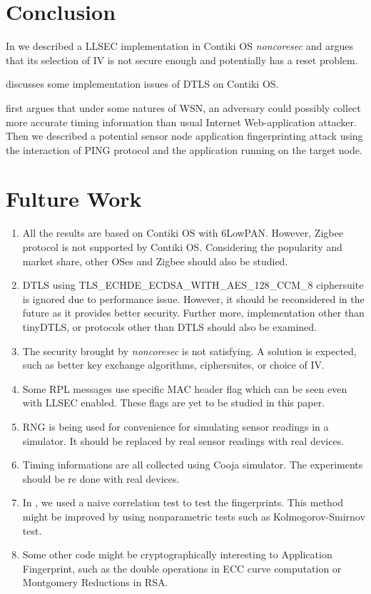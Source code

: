 \chapter{Conclusion} \label{Chp: Conclusion}

In  we described a LLSEC implementation in Contiki OS \textit{noncoresec} and argues that its selection of IV is not secure enough and potentially has a reset problem.

 discusses some implementation issues of DTLS on Contiki OS.

 first argues that under some natures of WSN, an adversary could possibly collect more accurate timing information than usual Internet Web-application attacker. Then we described a potential sensor node application fingerprinting attack using the interaction of PING protocol and the application running on the target node.

\chapter{Fulture Work}
\begin{enumerate}
\item All the results are based on Contiki OS with 6LowPAN. However, Zigbee\cite{Zigbee} protocol is not supported by Contiki OS. Considering the popularity and market share, other OSes and Zigbee should also be studied.

\item DTLS using TLS\_ECHDE\_ECDSA\_WITH\_AES\_128\_CCM\_8 ciphersuite is ignored due to performance issue. However, it should be reconsidered in the future as it provides better security. Further more, implementation other than tinyDTLS, or protocols other than DTLS should also be examined.

\item The security brought by \textit{noncoresec} is not satisfying. A solution is expected, such as better key exchange algorithms, ciphersuites, or choice of IV.

\item Some RPL messages use specific MAC header flag which can be seen even with LLSEC enabled. These flags are yet to be studied in this paper.

\item RNG is being used for convenience for simulating sensor readings in a simulator. It should be replaced by real sensor readings with real devices.

\item Timing informations are all collected using Cooja simulator. The experiments should be re done with real devices.

\item In , we used a naive correlation test to test the fingerprints. This method might be improved by using nonparametric tests such as Kolmogorov-Smirnov test.

\item Some other code might be cryptographically interesting to Application Fingerprint, such as the double operations in ECC curve computation or Montgomery Reductions in RSA.
\end{enumerate}